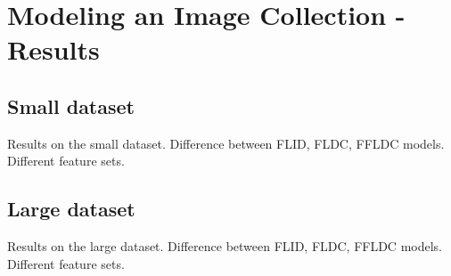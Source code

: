 \chapter{Modeling an Image Collection - Results}
\label{sec:results}

\section{Small dataset}

Results on the small dataset. Difference between FLID, FLDC, FFLDC models. Different feature sets.

\section{Large dataset}

Results on the large dataset. Difference between FLID, FLDC, FFLDC models. Different feature sets.